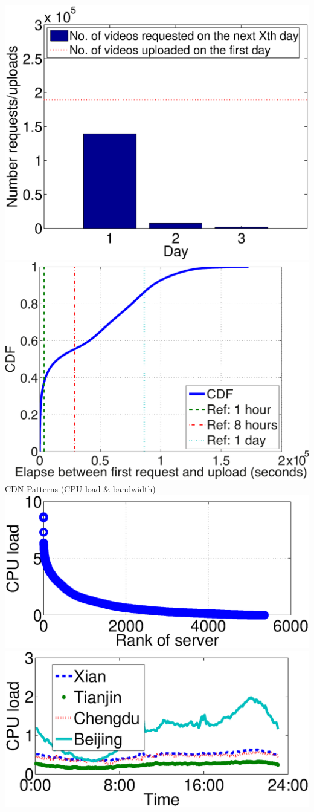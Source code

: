 \documentclass[landscape,final,a0paper,fontscale=0.285]{baposter}
\begin{document}
\begin{poster}
{		%
		\includegraphics[width=.46\linewidth]{fig/view-in-3-days.eps}
		\includegraphics[width=.50\linewidth]{fig/updowntimediff.pdf}\\
	CDN Patterns (CPU load \& bandwidth)\\
		\includegraphics[width=0.48\linewidth]{fig/cpuload_vs_server.eps}
		\includegraphics[width=0.48\linewidth]{fig/idc_cpuload_over_time.eps}
}
\end{poster}
\end{document}
